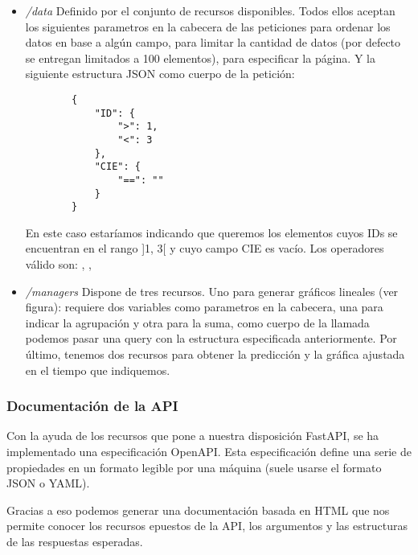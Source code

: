 \begin{itemize}
    \item \textit{/data} Definido por el conjunto de recursos disponibles. Todos ellos aceptan los siguientes parametros en la cabecera de las peticiones  para ordenar los datos en base a algún campo,  para limitar la cantidad de datos (por defecto se entregan limitados a 100 elementos),  para especificar la página.
    Y la siguiente estructura JSON como cuerpo de la petición:
    \begin{verbatim}
        {
            "ID": {
                ">": 1,
                "<": 3
            },
            "CIE": {
                "==": ""
            }
        }
    \end{verbatim}
    En este caso estaríamos indicando que queremos los elementos cuyos IDs se encuentran en el rango ]1, 3[ y cuyo campo CIE es vacío. Los operadores válido son: \codeword{==}, \codeword{<}, \codeword{>}

    \item \textit{/managers} Dispone de tres recursos. Uno para generar gráficos lineales (ver figura): requiere dos variables como parametros en la cabecera, una para indicar la agrupación y otra para la suma, como cuerpo de la llamada podemos pasar una query con la estructura especificada anteriormente. Por último, tenemos dos recursos para obtener la predicción y la gráfica ajustada en el tiempo que indiquemos.
\end{itemize}

\subsubsection{Documentación de la API}
Con la ayuda de los recursos que pone a nuestra disposición FastAPI, se ha implementado una especificación OpenAPI. Esta especificación define una serie de propiedades en un formato legible por una máquina (suele usarse el formato JSON o YAML).

Gracias a eso podemos generar una documentación basada en HTML que nos permite conocer los recursos epuestos de la API, los argumentos y las estructuras de las respuestas esperadas. 